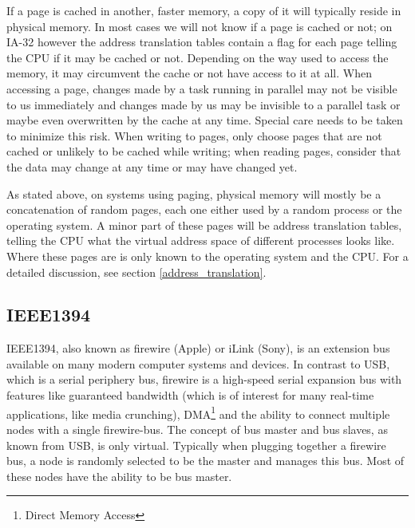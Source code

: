 If a page is cached in another, faster memory, a copy of it will typically
reside in physical memory. In most cases we will not know if a page is cached or
not; on IA-32 however the address translation tables contain a flag for each
page telling the CPU if it may be cached or not. Depending on the way used to
access the memory, it may circumvent the cache or not have access to it at all.
When accessing a page, changes made by a task running in parallel may not be
visible to us immediately and changes made by us may be invisible to a parallel
task or maybe even overwritten by the cache at any time. Special care needs to
be taken to minimize this risk. When writing to pages, only choose pages that
are not cached or unlikely to be cached while writing; when reading pages,
consider that the data may change at any time or may have changed yet.

As stated above, on systems using paging, physical memory will mostly be a
concatenation of random pages, each one either used by a random process or the
operating system. A minor part of these pages will be address translation
tables, telling the CPU what the virtual address space of different processes
looks like. Where these pages are is only known to the operating system and the
CPU. For a detailed discussion, see section \ref{address_translation}.



\subsection{IEEE1394}

\label{phys1394}
IEEE1394, also known as \epsfysize 0.3cm 
firewire (Apple) or iLink (Sony), is an extension bus available on many modern
computer systems and devices. In contrast to USB, which is a serial periphery
bus, firewire is a high-speed serial expansion bus with features like guaranteed
bandwidth (which is of interest for many real-time applications, like media
crunching), DMA\footnote{Direct Memory Access} and the ability to connect
multiple nodes with a single firewire-bus. The concept of bus master and bus
slaves, as known from USB, is only virtual. Typically when plugging together a
firewire bus, a node is randomly selected to be the master and manages this bus.
Most of these nodes have the ability to be bus master.

